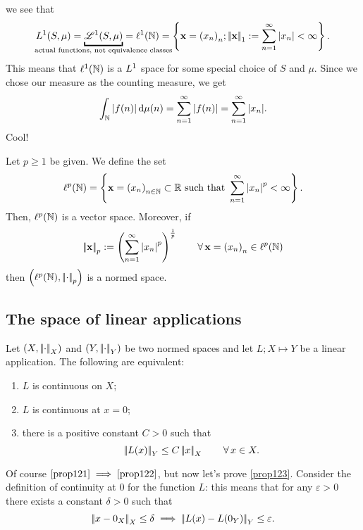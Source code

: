 \documentclass{article}
\begin{document}
we see that 
\begin{equation*}
	\Lone(S,\mu)=\underbracket{\mathscr{L}^1(S,\mu)}_{\mathclap{\text{actual functions, not equivalence classes}}}=\ell^1(\N)=\left\{\mathbf{x}={(x_{n})}_{n};\norm{\mathbf{x}}_{1}:=\sum_{n=1}^{\infty}|x_n|<\infty\right\}.
\end{equation*} 
This means that $\ell^1(\mathbb{N})$ is a $L^{1}$ space for some special choice of $S$ and $\mu$. Since we chose our measure as the counting measure, we get
\begin{equation*}
	\int_{\mathbb{N}}|f(n)|\mathop{}\!\mathrm{d}\mu(n)=\sum_{n=1}^\infty|f(n)|=\sum_{n=1}^\infty|x_n|.
\end{equation*}
Cool!
\begin{proposition}
	Let $p\geq1$ be given. We define the set
	\begin{equation*}
		\ell^p(\mathbb{N})=\left\{\mathbf{x}={(x_{n})}_{n\in\mathbb{N}}\subset\mathbb{R}\text{ such that }\sum_{n=1}^\infty\left|x_n\right|^{p}<\infty\right\}.
	\end{equation*}
	Then, $\ell^p(\mathbb{N})$ is a vector space. Moreover, if
	\begin{equation*}
		\left|\negthinspace\left|\mathbf{x}\right|\negthinspace\right|_{p}:=\left(\sum_{n=1}^\infty\left|x_n\right|^p\right)^{\frac{1}{p}}\qquad\forall\,\mathbf{x}={(x_{n})}_{n}\in\ell^p(\mathbb{N})
	\end{equation*}
	then $\left(\ell^p(\mathbb{N}),\left|\negthinspace\left|\cdot\right|\negthinspace\right|_p\right)$ is a normed space.
\end{proposition}
\subsection{The space of linear applications}
\begin{proposition}
	Let $(X,\left|\negthinspace\left|\cdot\right|\negthinspace\right|_X)$ and $(Y,\left|\negthinspace\left|\cdot\right|\negthinspace\right|_Y)$ be two normed spaces and let $L;X\mapsto Y$ be a linear application. The following are equivalent:
	\begin{enumerate}[\circnum]
		\item\label{prop121}$L$ is continuous on $X$;
		\item \label{prop122}$L$ is continuous at $x=0$;
		\item\label{prop123}there is a positive constant $C>0$ such that
		\[
		\left|\negthinspace\left|L(x)\right|\negthinspace\right|_Y\leq C\left|\negthinspace\left|x\right|\negthinspace\right|_X\qquad\forall\, x\in X.
		\]
	\end{enumerate}
\end{proposition} 
\begin{fancyproof}
	Of course $\ref{prop121}\implies\ref{prop122}$, but now let's prove \ref{prop123}. Consider the definition of continuity at 0 for the function $L$: this means that for any $\varepsilon>
	0$ there exists a constant $\delta>0$ such that
	\[
	\left|\negthinspace\left|x-0_X\right|\negthinspace\right|_X\leq\delta\implies\left|\negthinspace\left|L(x)-L(0_Y)\right|\negthinspace\right|_Y\leq\varepsilon.
	\]
\end{fancyproof}
\end{document}
